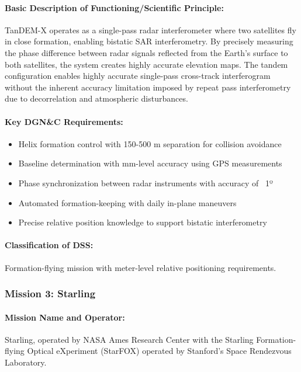 \paragraph{Basic Description of Functioning/Scientific Principle:}
TanDEM-X operates as a single-pass radar interferometer where two satellites fly in close formation, enabling bistatic SAR interferometry. By precisely measuring the phase difference between radar signals reflected from the Earth's surface to both satellites, the system creates highly accurate elevation maps. The tandem configuration enables highly accurate single-pass cross-track interferogram without the inherent accuracy limitation imposed by repeat pass interferometry due to decorrelation and atmospheric disturbances.

\paragraph{Key DGN\&C Requirements:}
\begin{itemize}
    \item Helix formation control with 150-500 m separation for collision avoidance
    \item Baseline determination with mm-level accuracy using GPS measurements
    \item Phase synchronization between radar instruments with accuracy of ~1º
    \item Automated formation-keeping with daily in-plane maneuvers
    \item Precise relative position knowledge to support bistatic interferometry
\end{itemize}

\paragraph{Classification of DSS:}
Formation-flying mission with meter-level relative positioning requirements.

\subsubsection{Mission 3: Starling}

\paragraph{Mission Name and Operator:} 
Starling, operated by NASA Ames Research Center with the Starling Formation-flying Optical eXperiment (StarFOX) operated by Stanford's Space Rendezvous Laboratory.


